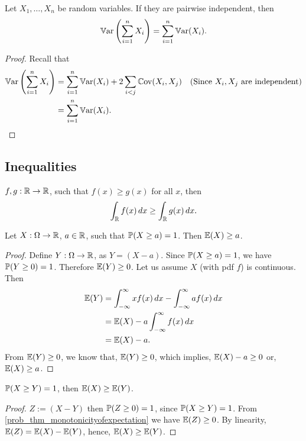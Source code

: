 \documentclass[10pt, a4paper]{article}
\begin{document}
\begin{corollary}
    Let $X_1, \dotsc, X_n$ be random variables.
    If they are pairwise independent,
    then
    \[
    \Var\left(\sum_{i = 1}^{n}X_i\right) = \sum_{i = 1}^{n}\Var(X_i).
    \]
    \begin{proof}
        Recall that
        \begin{align*}
            \Var\left(\sum_{i = 1}^{n}X_i\right) &= \sum_{i = 1}^{n}\Var(X_i) + 2\sum_{i < j}\Cov(X_i, X_j) & \text{(Since $X_i, X_j$ are independent)} \\
            &= \sum_{i = 1}^{n}\Var(X_i).
        \end{align*}
    \end{proof}
\end{corollary}

\subsection{Inequalities}
$f, g : \R \rightarrow \R$,
such that
$f(x) \geq g(x)$ for all $x$,
then
\[
\int_{\R}f(x)\,dx \geq \int_{\R}g(x)\,dx.
\]
\begin{theorem}\label{prob_thm_monotonicityofexpectation}
    Let $X : \Omega \rightarrow \R$,
    $a \in \R$,
    such that $\P(X \geq a) = 1$.
    Then $\E(X) \geq a$.
    \begin{proof}
        Define $Y : \Omega \rightarrow \R$,
        as $Y = (X - a).$
        Since $\P(X \geq a) = 1$,
        we have $\P(Y \geq 0) = 1$.
        Therefore $\E(Y) \geq 0$.
        Let us assume $X$
        (with pdf $f$)
        is continuous.
        Then
        \begin{align*}
            \E(Y) &= \int_{-\infty}^{\infty}xf(x)\,dx - \int_{-\infty}^{\infty}af(x)\,dx \\
            &= \E(X) - a\int_{-\infty}^{\infty}f(x)\,dx \\
            &= \E(X) - a.
        \end{align*}
        From $\E(Y) \geq 0$,
        we know that,
        $\E(Y) \geq 0$,
        which implies,
        $\E(X) - a \geq 0$ or,
        $\E(X) \geq a$.
    \end{proof}
\end{theorem}

\begin{example}
    $\P(X \geq Y) = 1$,
    then $\E(X) \geq \E(Y)$.
    \begin{proof}
        $Z := (X - Y)$ then $\P(Z \geq 0) = 1$,
        since $\P(X \geq Y) = 1$.
        From \autoref{prob_thm_monotonicityofexpectation} we have $\E(Z) \geq 0$.
        By linearity,
        $\E(Z) = \E(X) - \E(Y)$,
        hence,
        $\E(X) \geq \E(Y)$.
    \end{proof}
\end{example}
\end{document}
